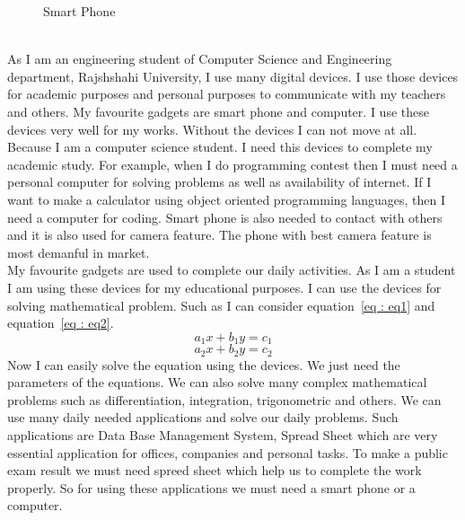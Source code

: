 \begin{figure}[h]
\begin{minipage}[b]{.48\textwidth}
     \caption{Smart Phone} 
     \label{fig:fig3}
    \end{minipage}  
\end{figure}\\
As I am an engineering student of Computer Science and Engineering department, Rajshshahi University, I use many digital devices. I use those devices for academic purposes and personal purposes to communicate with my teachers and others. My favourite gadgets are smart phone and computer. I use these devices very well for my works. Without the devices I can not move at all. Because I am a computer science student. I need this devices to complete my academic study.  For example, when I do programming contest then I must need a personal computer for solving problems as well as availability of internet. If I want to make a calculator using object oriented programming languages, then I need a computer for coding. Smart phone is also needed to contact with others and it is also used for camera feature. The phone with best camera feature is most demanful in market.\\
My favourite gadgets are used to complete our daily activities. As I am a student I am using these devices for my educational purposes. I can use the devices for solving mathematical problem. Such as I can consider equation~\ref{eq : eq1} and equation~\ref{eq : eq2}.
\begin{equation}
    a_1x + b_1y = c_1
    \label{eq : eq1}
\end{equation}
\begin{equation}
    a_2x + b_2y = c_2
    \label{eq : eq2}
\end{equation}
Now I can easily solve the equation using the devices. We just need the parameters of the equations. We can also solve many complex mathematical problems such as differentiation, integration, trigonometric and others. 
We can use many daily needed applications and solve our daily problems. Such applications are Data Base Management System, Spread Sheet which are very essential application for offices, companies and personal tasks. To make a public exam result we must need spreed sheet which help us to complete the work properly. So for using these applications we must need a smart phone or a computer.